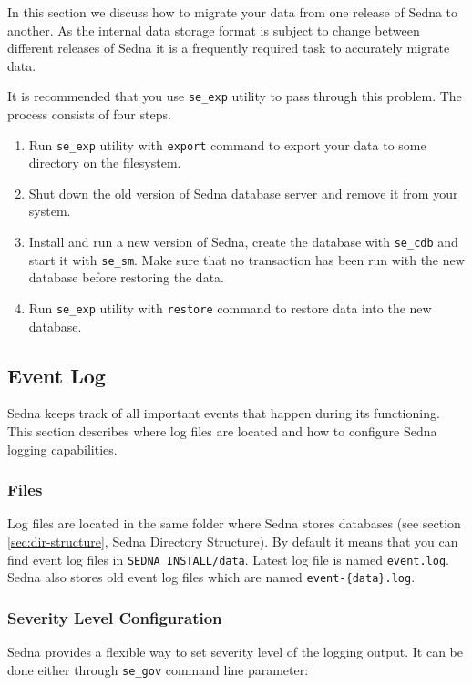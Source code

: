 \documentclass[a4paper,12pt]{article}
\begin{document}
In this section we discuss how to migrate your data from one release of Sedna to
another. As the internal data storage format is subject to change between
different releases of Sedna it is a frequently required task to accurately
migrate data.

It is recommended that you use \verb!se_exp! utility to pass through this
problem. The process consists of four steps.

\begin{enumerate}
\item Run \verb!se_exp! utility with \verb!export! command to export your data
to some directory on the filesystem.
\item Shut down the old version of Sedna database server and remove it from your
system.
\item Install and run a new version of Sedna, create the database with
\verb!se_cdb! and start it with \verb!se_sm!. Make sure that no transaction has
been run with the new database before restoring the data.
\item Run \verb!se_exp! utility with \verb!restore! command to restore data into
the new database.
\end{enumerate}

\subsection{Event Log}
\label{sec:event-log}

Sedna keeps track of all important events that happen during its functioning.
This section describes where log files are located and how to configure Sedna
logging capabilities.

\subsubsection{Files}
Log files are located in the same folder where Sedna stores databases (see
section \ref{sec:dir-structure}, Sedna Directory Structure). By default it means
that you can find event log files in \verb!SEDNA_INSTALL/data!. Latest log file
is named \verb!event.log!. Sedna also stores old event log files which are named
\verb!event-{data}.log!.

\subsubsection{Severity Level Configuration}
Sedna provides a flexible way to set severity level of the logging output. It
can be done either through \verb!se_gov! command line parameter:
\end{document}
